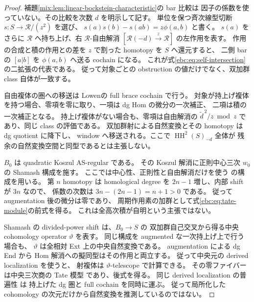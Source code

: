 \begin{proof}
補題\ref{mix:lem:linear-bockstein-characteristic}の bar 比較は
因子の係数を使っていない。その比較を次数 $d$ を明示して記す。
単位を保つ斉次線型切断 $s:S\to\mathcal R/(z^2)$ を選び、
$s(a)s(b)-s(ab)=z\phi(a,b)$ と書く。
$s(a)$ をさらに $\mathcal R$ へ持ち上げ、右 $\mathcal R$-自由解消
$[\mathcal R(-d)\xrightarrow{z}\mathcal R]$ の左作用を表す。
作用の合成と積の作用との差を $z$ で割った homotopy を $S$ へ還元すると、
二側 bar の $[a|b]$ を $\phi(a,b)$ へ送る cochain になる。
これが式\eqref{ebc:eq:self-intersection}の二拡張の代表である。
従って対象ごとの obstruction の値だけでなく、双加群 class 自体が一致する。

自由複体の圏への移送は
Lowen\cite[Theorems~3.21, 4.15]{CMOLowenCharacteristic}の
full brace cochain で行う。
対象が持上げ複体を持つ場合、零項を零に取り、一項は dg Hom の微分の一次補正、
二項は積の一次補正となる。
持上げ複体がない場合も、零項は自由解消の
$\widetilde d^{\,2}/z\bmod z$ であり、同じ class の評価である。
双加群射による自然変換とその homotopy は dg quotient に降下し、
window へ移送される。ここで $\operatorname{HH}^2(S)_{-d}$ 全体が
残余の自然変換空間と同型であるとは主張しない。

$B_0$ は quadratic Koszul AS-regular である。
その Koszul 解消に正則中心三次 $w_0$ の Shamash 構成を施す。
ここでは中心性、正則性と自由解消だけを使う
\cite[Constructions~4.1.1, 4.3.1, Proposition~4.3.2]{CMOEisenbudPeeva}の構成を用いる。
第 $n$ homotopy は homological degree を $2n-1$ 増し、内部 shift が $3n$ なので、
係数の次数は $3n-(2n-1)=n+1>0$ である。
従って augmentation 後の微分は零であり、
周期作用素の加群として式\eqref{ebc:eq:tate-module}の前式を得る。
これは全高次積が自明という主張ではない。

Shamash の divided-power shift は、$B_0\to S$ の
双加群自己交叉から得る中央 cohomology operator $\vartheta$ を表す。
同じ構成を augmented な一次持上げ上で行う場合も、
$\vartheta$ は全相対 Ext 上の中央自然変換である。
augmentation による dg End から Hom 解消への擬同型はその作用と両立する。
従って中央元の derived localization
\cite[Theorem~5.3, Corollary~5.16]{NFMBCLLocalization}を使うと、
射複体は $\vartheta$-telescope で計算できる。
その零ファイバーは中央三次商の Tate 模型
であり、後式を得る。
同じ derived localization の普遍性
\cite[Proposition~3.17, Theorem~3.18]{NFMBCLLocalization}は
持上げた dg 圏と full cochain を同時に運ぶ。
従って局所化した cohomology の次元だけから自然変換を推測しているのではない。
\end{proof}

